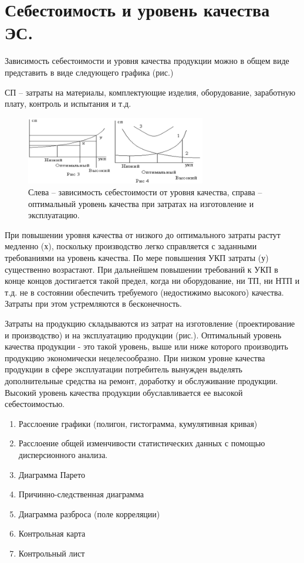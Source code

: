 \documentclass[unicode, 12pt, a4paper, oneside]{article}
\begin{document}
\section{Себестоимость и уровень качества ЭС.}

Зависимость себестоимости и уровня качества продукции можно в общем виде представить в виде следующего графика (рис.)

СП – затраты на материалы, комплектующие  изделия, оборудование, заработную плату, контроль и испытания и т.д. 
 \begin{figure}
 \centering 
 \includegraphics[width=0.7\textwidth]{33_Sebestoim.png}
 \caption{Слева -- зависимость себестоимости от уровня качества, справа --оптимальный уровень качества при затратах на изготовление и эксплуатацию.}
 \end{figure}
При повышении уровня качества от низкого до оптимального затраты растут медленно (х), поскольку производство легко справляется с заданными требованиями на уровень качества. По мере повышения УКП затраты (у) существенно возрастают. При дальнейшем повышении требований к УКП в конце концов достигается такой предел, когда ни оборудование, ни ТП, ни НТП и т.д. не в состоянии обеспечить требуемого (недостижимо высокого) качества. Затраты при этом устремляются в бесконечность.

Затраты на продукцию складываются из затрат на изготовление (проектирование и производство) и на эксплуатацию продукции (рис.).
Оптимальный уровень качества продукции - это такой уровень, выше или ниже которого производить продукцию экономически нецелесообразно.
При низком уровне качества продукции в сфере эксплуатации потребитель вынужден выделять дополнительные средства на ремонт, доработку и обслуживание продукции.
Высокий уровень качества продукции обуславливается ее высокой себестоимостью. 


\begin{enumerate}
\item Расслоение графики (полигон, гистограмма, кумулятивная кривая)
\item Расслоение общей изменчивости статистических данных с помощью дисперсионного анализа.
\item Диаграмма Парето
\item Причинно-следственная диаграмма
\item Диаграмма разброса (поле корреляции)
\item Контрольная карта
\item Контрольный лист
\end{enumerate}
\end{document}
